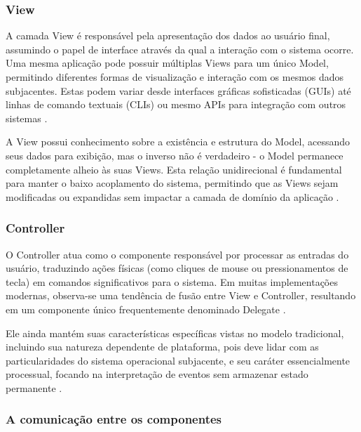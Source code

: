         \subsubsection{View}
            \par A camada View é responsável pela apresentação dos dados ao usuário final, assumindo o papel de interface através da qual a interação com o sistema ocorre. Uma mesma aplicação pode possuir múltiplas Views para um único Model, permitindo diferentes formas de visualização e interação com os mesmos dados subjacentes. Estas podem variar desde interfaces gráficas sofisticadas (GUIs) até linhas de comando textuais (CLIs) ou mesmo APIs para integração com outros sistemas \cite{artigo:deacon:2009}.
            
            \par A View possui conhecimento sobre a existência e estrutura do Model, acessando seus dados para exibição, mas o inverso não é verdadeiro - o Model permanece completamente alheio às suas Views. Esta relação unidirecional é fundamental para manter o baixo acoplamento do sistema, permitindo que as Views sejam modificadas ou expandidas sem impactar a camada de domínio da aplicação \cite{artigo:deacon:2009}.

        \subsubsection{Controller}
            \par O Controller atua como o componente responsável por processar as entradas do usuário, traduzindo ações físicas (como cliques de mouse ou pressionamentos de tecla) em comandos significativos para o sistema. Em muitas implementações modernas, observa-se uma tendência de fusão entre View e Controller, resultando em um componente único frequentemente denominado Delegate \cite{artigo:deacon:2009}.
            
            \par Ele ainda mantém suas características específicas vistas no modelo tradicional, incluindo sua natureza dependente de plataforma, pois deve lidar com as particularidades do sistema operacional subjacente, e seu caráter essencialmente processual, focando na interpretação de eventos sem armazenar estado permanente \cite{artigo:deacon:2009}.
            
        \subsubsection{A comunicação entre os componentes}
        
